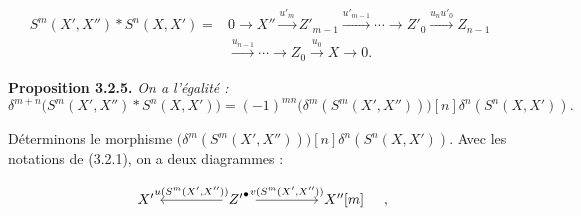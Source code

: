 \begin{equation}
\begin{aligned}
S^m(X',X'')*S^n(X,X')={}&
0\longrightarrow X''\xrightarrow{u'_m}Z'_{m-1}
\xrightarrow{u'_{m-1}}\cdots\longrightarrow Z'_0
\xrightarrow{u_nu'_0}Z_{n-1}\\
&\xrightarrow{u_{n-1}}\cdots\longrightarrow Z_0
\xrightarrow{u_0}X\longrightarrow0.
\end{aligned}
\tag{3.2.4.1}
\end{equation}

\medskip\noindent\textbf{Proposition 3.2.5.}\quad
\textit{On a l'égalité :}
\[
\delta^{m+n}\bigl(S^m(X',X'')*S^n(X,X')\bigr)=
(-1)^{mn}\bigl(\delta^m(S^m(X',X''))\bigr)[n]
\delta^n(S^n(X,X')).
\]

Déterminons le morphisme
$\bigl(\delta^m(S^m(X',X''))\bigr)[n]\delta^n(S^n(X,X'))$.
Avec les notations de (3.2.1), on a deux diagrammes :

\[
\begin{tikzcd}[column sep=4.5em]
X' & {Z'}^\bullet
  \arrow[l,"{u(S^m(X',X''))}"']
  \arrow[r,"{v(S^m(X',X''))}"]
& X''[m]
\end{tikzcd}
\quad,
\]
\endgroup
